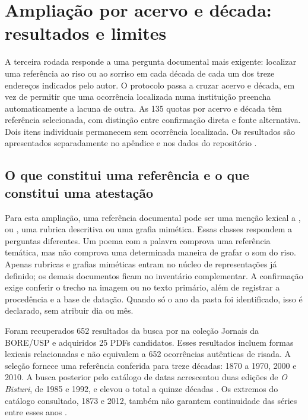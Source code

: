 \section{Ampliação por acervo e década: resultados e limites}
\label{sec:acervos}

A terceira rodada responde a uma pergunta documental mais exigente: localizar uma referência ao riso ou ao sorriso em cada década de cada um dos treze endereços indicados pelo autor. O protocolo passa a cruzar acervo e década, em vez de permitir que uma ocorrência localizada numa instituição preencha automaticamente a lacuna de outra. As 135 quotas por acervo e década têm referência selecionada, com distinção entre confirmação direta e fonte alternativa. Dois itens individuais permanecem sem ocorrência localizada. Os resultados são apresentados separadamente no apêndice e nos dados do repositório \repo.

\subsection{O que constitui uma referência e o que constitui uma atestação}

Para esta ampliação, uma referência documental pode ser uma menção lexical a ,  ou , uma rubrica descritiva ou uma grafia mimética. Essas classes respondem a perguntas diferentes. Um poema com a palavra  comprova uma referência temática, mas não comprova uma determinada maneira de grafar o som do riso. Apenas rubricas e grafias miméticas entram no núcleo de representações já definido; os demais documentos ficam no inventário complementar. A confirmação exige conferir o trecho na imagem ou no texto primário, além de registrar a procedência e a base de datação. Quando só o ano da pasta foi identificado, isso é declarado, sem atribuir dia ou mês.

Foram recuperados 652 resultados da busca por  na coleção Jornais da BORE/USP e adquiridos 25 PDFs candidatos. Esses resultados incluem formas lexicais relacionadas e não equivalem a 652 ocorrências autênticas de risada. A seleção fornece uma referência conferida para treze décadas: 1870 a 1970, 2000 e 2010. A busca posterior pelo catálogo de datas acrescentou duas edições de \textit{O Bisturi}, de 1985 e 1992, e elevou o total a quinze décadas \cite{acervoD123,acervoD124}. Os extremos do catálogo consultado, 1873 e 2012, também não garantem continuidade das séries entre esses anos \cite{r3archiveH04}.

